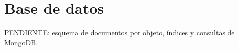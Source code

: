 \section{Base de datos}

PENDIENTE: esquema de documentos por objeto, índices y consultas de MongoDB.
